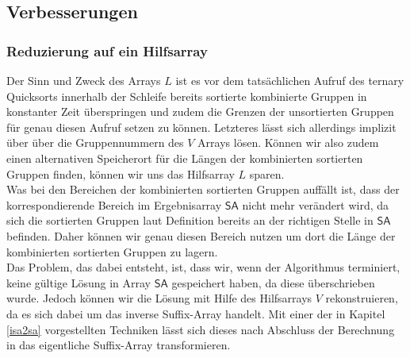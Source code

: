 \subsection{Verbesserungen}
\subsubsection{Reduzierung auf ein Hilfsarray}
Der Sinn und Zweck des Arrays $L$ ist es vor dem tatsächlichen Aufruf des ternary Quicksorts innerhalb der Schleife bereits sortierte kombinierte Gruppen in konstanter Zeit überspringen und zudem die Grenzen der unsortierten Gruppen für genau diesen Aufruf setzen zu können. Letzteres lässt sich allerdings implizit über über die Gruppennummern des $V$ Arrays lösen. Können wir also zudem einen alternativen Speicherort für die Längen der kombinierten sortierten Gruppen finden, können wir uns das Hilfsarray $L$ sparen.\\
Was bei den Bereichen der kombinierten sortierten Gruppen auffällt ist, dass der korrespondierende Bereich im Ergebnisarray $\mathsf{SA}$ nicht mehr verändert wird, da sich die sortierten Gruppen laut Definition bereits an der richtigen Stelle in $\mathsf{SA}$ befinden. Daher können wir genau diesen Bereich nutzen um dort die Länge der kombinierten sortierten Gruppen zu lagern.\\
Das Problem, das dabei entsteht, ist, dass wir, wenn der Algorithmus terminiert, keine gültige Lösung in Array $\mathsf{SA}$ gespeichert haben, da diese überschrieben wurde. Jedoch können wir die Lösung mit Hilfe des Hilfsarrays $V$ rekonstruieren, da es sich dabei um das inverse Suffix-Array handelt. Mit einer der in Kapitel \ref{isa2sa} vorgestellten Techniken lässt sich dieses nach Abschluss der Berechnung in das eigentliche Suffix-Array transformieren.\\


